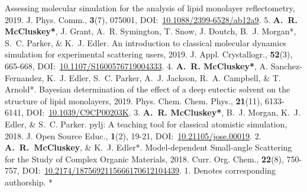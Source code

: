 \begin{cvpubys}
    {Assessing molecular simulation for the analysis of lipid monolayer reflectometry,}
    {2019.}
    {J. Phys. Comm.,}
    {\textbf{3}(7), 075001,}
    {DOI:~\href{https://doi.org/10.1088/2399-6528/ab12a9}{10.1088/2399-6528/ab12a9}.}
    {5.}
  \cvpuby
    {\textbf{A.~R. McCluskey*}, J. Grant, A.~R. Symington, T. Snow, J. Doutch, B.~J. Morgan*, S.~C. Parker, \& K.~J. Edler.}
    {An introduction to classical molecular dynamics simulation for experimental scattering users,}
    {2019.}
    {J. Appl. Crystallogr.,}
    {\textbf{52}(3), 665-668,}
    {DOI:~\href{https://doi.org/10.1107/S1600576719004333}{10.1107/S1600576719004333}.}
    {4.}
  \cvpuby
    {\textbf{A.~R. McCluskey*}, A. Sanchez-Fernandez, K.~J. Edler, S.~C. Parker, A.~J. Jackson, R.~A. Campbell, \& T. Arnold*.}
    {Bayesian determination of the effect of a deep eutectic solvent on the structure of lipid monolayers,}
    {2019.}
    {Phys. Chem. Chem. Phys.,}
    {\textbf{21}(11), 6133-6141,}
    {DOI:~\href{https://doi.org/10.1039/C9CP00203K}{10.1039/C9CP00203K}.}
    {3.}
  \cvpuby
    {\textbf{A.~R. McCluskey*}, B.~J. Morgan, K.~J. Edler, \& S.~C. Parker.}
    {pylj: A teaching tool for classical atomistic simulation,}
    {2018.}
    {J. Open Source Educ.,}
    {\textbf{1}(2), 19-21,}
    {DOI:~\href{http://doi.org/10.21105/jose.00019}{10.21105/jose.00019}.}
    {2.}
  \cvpuby
    {\textbf{A.~R.~McCluskey}, \& K.~J. Edler*.}
    {Model-dependent Small-angle Scattering for the Study of Complex Organic Materials,}
    {2018.}
    {Curr. Org. Chem.,}
    {\textbf{22}(8), 750-757,}
    {DOI:~\href{http://doi.org/10.2174/1875692115666170612104439}{10.2174/1875692115666170612104439}.}
    {1.}
  \cvpuby
    {Denotes corresponding authorship.}
    {}
    {}
    {}
    {}
    {}
    {*}
\end{cvpubys}
